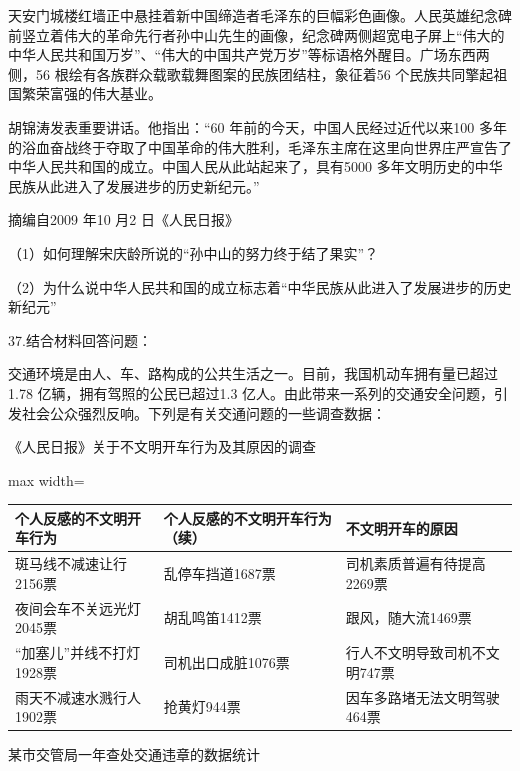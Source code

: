 \documentclass[UTF8,11pt]{ctexart}
\begin{document}
天安门城楼红墙正中悬挂着新中国缔造者毛泽东的巨幅彩色画像。人民英雄纪念碑前竖立着伟大的革命先行者孙中山先生的画像，纪念碑两侧超宽电子屏上“伟大的中华人民共和国万岁”、“伟大的中国共产党万岁”等标语格外醒目。广场东西两侧，56 根绘有各族群众载歌载舞图案的民族团结柱，象征着56 个民族共同擎起祖国繁荣富强的伟大基业。

胡锦涛发表重要讲话。他指出：“60 年前的今天，中国人民经过近代以来100 多年的浴血奋战终于夺取了中国革命的伟大胜利，毛泽东主席在这里向世界庄严宣告了中华人民共和国的成立。中国人民从此站起来了，具有5000 多年文明历史的中华民族从此进入了发展进步的历史新纪元。”

摘编自2009 年10 月2 日《人民日报》

（1）如何理解宋庆龄所说的“孙中山的努力终于结了果实”？


（2）为什么说中华人民共和国的成立标志着“中华民族从此进入了发展进步的历史新纪元”


37.结合材料回答问题：

交通环境是由人、车、路构成的公共生活之一。目前，我国机动车拥有量已超过1.78 亿辆，拥有驾照的公民已超过1.3 亿人。由此带来一系列的交通安全问题，引发社会公众强烈反响。下列是有关交通问题的一些调查数据：

《人民日报》关于不文明开车行为及其原因的调查


\begin{center}\begin{adjustbox}{max width=\linewidth}\begin{tabular}{|>{\raggedright\arraybackslash}p{\dimexpr(\linewidth-6\tabcolsep-4\arrayrulewidth)/3\relax}|>{\raggedright\arraybackslash}p{\dimexpr(\linewidth-6\tabcolsep-4\arrayrulewidth)/3\relax}|>{\raggedright\arraybackslash}p{\dimexpr(\linewidth-6\tabcolsep-4\arrayrulewidth)/3\relax}|}\hline
个人反感的不文明开车行为 & 个人反感的不文明开车行为（续） & 不文明开车的原因\\\hline
斑马线不减速让行2156票 & 乱停车挡道1687票 & 司机素质普遍有待提高2269票\\\hline
夜间会车不关远光灯2045票 & 胡乱鸣笛1412票 & 跟风，随大流1469票\\\hline
“加塞儿”并线不打灯1928票 & 司机出口成脏1076票 & 行人不文明导致司机不文明747票\\\hline
雨天不减速水溅行人1902票 & 抢黄灯944票 & 因车多路堵无法文明驾驶464票\\\hline\end{tabular}\end{adjustbox}\end{center}

某市交管局一年查处交通违章的数据统计
\end{document}
